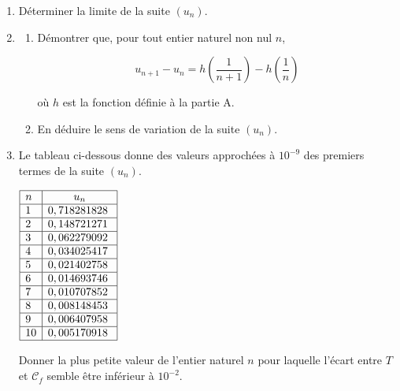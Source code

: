 \documentclass[10pt]{article}
\providecommand{\np}[2][]{{#2~#1}}
\begin{document}
\begin{enumerate}[resume]
\item Déterminer la limite de la suite $\left(u_n\right)$.
\item 
	\begin{enumerate}
		\item Démontrer que, pour tout entier naturel non nul $n$,
		
\[u_{n+1} - u_n = h\left(\dfrac{1}{n + 1}\right) - h\left(\dfrac{1}{n}\right) \]

où $h$ est la fonction définie à la partie A.
		\item En déduire le sens de variation de la suite $\left(u_n\right)$.
	\end{enumerate}
\item Le tableau ci-dessous donne des valeurs approchées à $10^{-9}$ des premiers termes de la suite $\left(u_n\right)$.

\begin{center}
$\begin{array}{|l|c|}\hline
n &u_n\\ \hline
1 &\np{0,718281828}\\ \hline
2 &\np{0,148721271}\\ \hline
3 &\np{0,062279092}\\ \hline
4 &\np{0,034025417}\\ \hline
5 &\np{0,021402758}\\ \hline
6 &\np{0,014693746}\\ \hline
7 &\np{0,010707852}\\ \hline
8 &\np{0,008148453}\\ \hline
9 &\np{0,006407958}\\ \hline
10 &\np{0,005170918}\\ \hline
\end{array}$
\end{center}

Donner la plus petite valeur de l'entier naturel $n$ pour laquelle l'écart entre $T$ et $\mathcal{C}_f$ semble être inférieur à $10^{-2}$.


\end{enumerate}

\bigskip
\end{document}
